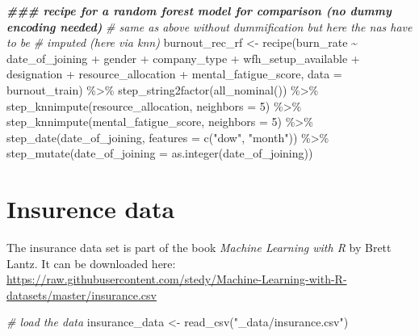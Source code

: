\documentclass[
]{book}
\newenvironment{Shaded}{\begin{snugshade}}{\end{snugshade}}
\newcommand{\AttributeTok}[1]{\textcolor[rgb]{0.77,0.63,0.00}{#1}}
\newcommand{\CommentTok}[1]{\textcolor[rgb]{0.56,0.35,0.01}{\textit{#1}}}
\newcommand{\DecValTok}[1]{\textcolor[rgb]{0.00,0.00,0.81}{#1}}
\newcommand{\DocumentationTok}[1]{\textcolor[rgb]{0.56,0.35,0.01}{\textbf{\textit{#1}}}}
\newcommand{\FunctionTok}[1]{\textcolor[rgb]{0.00,0.00,0.00}{#1}}
\newcommand{\NormalTok}[1]{#1}
\newcommand{\OtherTok}[1]{\textcolor[rgb]{0.56,0.35,0.01}{#1}}
\newcommand{\SpecialCharTok}[1]{\textcolor[rgb]{0.00,0.00,0.00}{#1}}
\newcommand{\StringTok}[1]{\textcolor[rgb]{0.31,0.60,0.02}{#1}}
\begin{document}
\begin{Shaded}
\begin{Highlighting}[]
\DocumentationTok{\#\#\# recipe for a random forest model for comparison (no dummy encoding needed)}
\CommentTok{\# same as above without dummification but here the na\textquotesingle{}s have to be}
\CommentTok{\# imputed (here via knn)}
\NormalTok{burnout\_rec\_rf }\OtherTok{\textless{}{-}} \FunctionTok{recipe}\NormalTok{(burn\_rate }\SpecialCharTok{\textasciitilde{}}\NormalTok{ date\_of\_joining }\SpecialCharTok{+}\NormalTok{ gender }\SpecialCharTok{+}
\NormalTok{                         company\_type }\SpecialCharTok{+}\NormalTok{ wfh\_setup\_available }\SpecialCharTok{+}
\NormalTok{                         designation }\SpecialCharTok{+}\NormalTok{ resource\_allocation }\SpecialCharTok{+}
\NormalTok{                         mental\_fatigue\_score,}
                         \AttributeTok{data =}\NormalTok{ burnout\_train) }\SpecialCharTok{\%\textgreater{}\%}
  \FunctionTok{step\_string2factor}\NormalTok{(}\FunctionTok{all\_nominal}\NormalTok{()) }\SpecialCharTok{\%\textgreater{}\%}
  \FunctionTok{step\_knnimpute}\NormalTok{(resource\_allocation, }\AttributeTok{neighbors =} \DecValTok{5}\NormalTok{) }\SpecialCharTok{\%\textgreater{}\%}
  \FunctionTok{step\_knnimpute}\NormalTok{(mental\_fatigue\_score, }\AttributeTok{neighbors =} \DecValTok{5}\NormalTok{) }\SpecialCharTok{\%\textgreater{}\%}
  \FunctionTok{step\_date}\NormalTok{(date\_of\_joining, }\AttributeTok{features =} \FunctionTok{c}\NormalTok{(}\StringTok{"dow"}\NormalTok{, }\StringTok{"month"}\NormalTok{)) }\SpecialCharTok{\%\textgreater{}\%}
  \FunctionTok{step\_mutate}\NormalTok{(}\AttributeTok{date\_of\_joining =} \FunctionTok{as.integer}\NormalTok{(date\_of\_joining))}
\end{Highlighting}
\end{Shaded}

\hypertarget{insurence-data}{%
\section{Insurence data}\label{insurence-data}}

The insurance data set is part of the book \emph{Machine Learning with R} by Brett Lantz. It can be downloaded here:
\url{https://raw.githubusercontent.com/stedy/Machine-Learning-with-R-datasets/master/insurance.csv}

\begin{Shaded}
\begin{Highlighting}[]
\CommentTok{\# load the data}
\NormalTok{insurance\_data }\OtherTok{\textless{}{-}} \FunctionTok{read\_csv}\NormalTok{(}\StringTok{"\_data/insurance.csv"}\NormalTok{)}
\end{Highlighting}
\end{Shaded}
\end{document}
